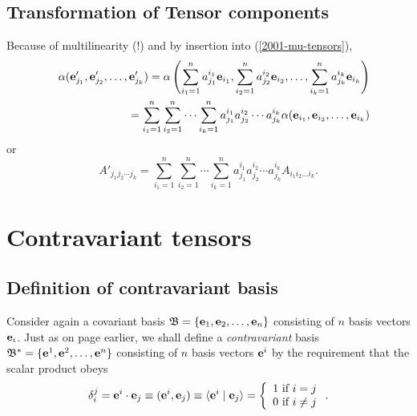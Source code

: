 \subsection{Transformation of Tensor components}

Because of multilinearity (!) and by insertion into
(\ref{2001-mu-tensors}),
\begin{eqnarray}
&&\alpha ( {\bf e}'_{j_1},{\bf e}'_{j_2},\ldots ,{\bf e}'_{j_k})=
\alpha \left(
\sum_{i_1=1}^n a_{j_1}^{i_1} {\bf e}_{i_1},
\sum_{i_2=1}^n a_{j_2}^{i_2} {\bf e}_{i_2},
\ldots ,
\sum_{i_k=1}^n a_{j_k}^{i_k} {\bf e}_{i_k}
\right)
\nonumber \\&& \quad
=
\sum_{i_1=1}^n\sum_{i_2=1}^n\cdots \sum_{i_k=1}^n
a_{j_1}^{i_1}a_{j_2}^{i_2}\cdots a_{j_k}^{i_k} \alpha ( {\bf e}_{i_1},{\bf e}_{i_2},\ldots ,{\bf e}_{i_k})
\end{eqnarray}
or
\begin{equation}
A'_{{j_1}{j_2}\cdots {j_k}}=
\sum_{i_1=1}^n\sum_{i_2=1}^n\cdots \sum_{i_k=1}^n
a_{j_1}^{i_1}a_{j_2}^{i_2}\cdots a_{j_k}^{i_k} A_{i_1 i_2\ldots i_k}.
\label{2011-m-tvtcov}
\end{equation}


\section{Contravariant tensors}

\subsection{Definition of contravariant basis}

Consider again a covariant basis
${\mathfrak B}=\{{\bf e}_1,{\bf e}_2,\ldots ,{\bf e}_n\}$ consisting of
$n$ basis vectors ${\bf e}_i$.
Just as on page \pageref{2011-m-Dualbasis} earlier, we shall define a {\em contravariant} basis
${\mathfrak B^\ast}=\{{\bf e}^1,{\bf e}^2,\ldots ,{\bf e}^n\}$ consisting of
$n$ basis vectors ${\bf e}^i$
by the requirement that the scalar product obeys
\begin{equation}
\delta_i^j =  {\bf e}^i\cdot{\bf e}_j\equiv ({\bf e}^i,{\bf e}_j)\equiv \langle {\bf e}^i\mid {\bf e}_j\rangle
 =\left\{
 \begin{array}{l}
1 \mbox{ if } i=j \\
0 \mbox{ if } i\neq j  \\
\end{array}
 \right. .
\label{2001-mu-tensors0}
\end{equation}




